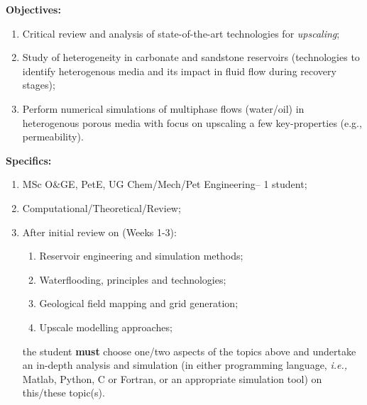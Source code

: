 \documentclass[12pts,a4paper,amsmath,amssymb,floatfix]{article}%
\newcommand{\all}{MSc O$\&$GE, PetE, UG Chem/Mech/Pet Engineering}
\newcommand{\ie}{{\it i.e., }}
\begin{document}
\begin{enumerate}[label=\bfseries Project: \arabic*:]
\noindent
{\bf Objectives:}
\begin{enumerate}
\item Critical review and analysis of state-of-the-art technologies for {\it upscaling};
\item Study of heterogeneity in carbonate and sandstone reservoirs (technologies to identify heterogenous media and its impact in fluid flow during recovery stages);
\item Perform numerical simulations of multiphase flows (water/oil) in heterogenous porous media with focus on upscaling a few key-properties (e.g., permeability).  
\end{enumerate}

\noindent
{\bf Specifics:} 
\begin{enumerate}
\item \all -- 1 student;
\item Computational/Theoretical/Review;
\item After initial review on (Weeks 1-3):
   \begin{enumerate}
       \item Reservoir engineering and simulation methods;
       \item Waterflooding, principles and technologies;
       \item Geological field mapping and grid generation;
       \item Upscale modelling approaches;
   \end{enumerate}
the student {\bf must} choose one/two aspects of the topics above and undertake an in-depth analysis and simulation (in either programming language, \ie Matlab, Python, C or Fortran, or an appropriate simulation tool) on this/these topic(s).
\end{enumerate}



\end{enumerate}
\end{document}
